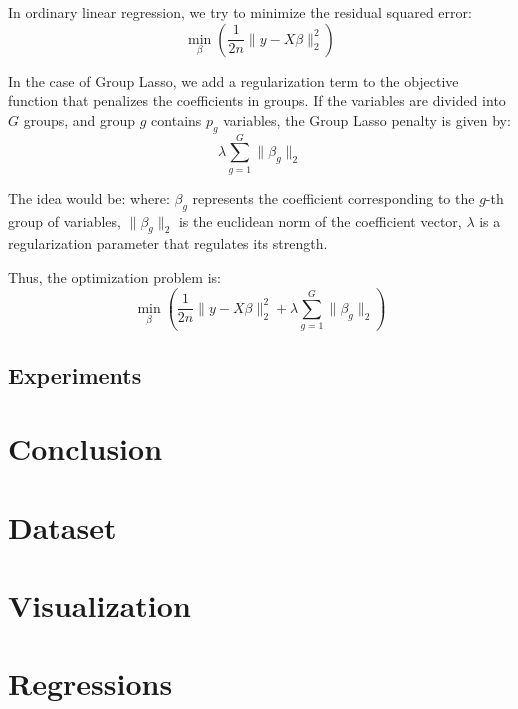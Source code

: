 \documentclass[a4paper, 8pt]{article}
\begin{document}
\begin{multicols}{2}
In ordinary linear regression, we try to minimize the residual squared error:
\begin{equation}
\min_{\beta}\left (\frac{1}{2n}\lVert y-X\beta\rVert^{2}_{2} \right)
\end{equation}

In the case of Group Lasso, we add a regularization term to the objective function that penalizes the coefficients in groups. If the variables are divided into $G$ groups, and group $g$ contains $p_{g}$ variables, the Group Lasso penalty is given by:
\begin{equation}
\lambda \sum_{g=1}^{G}\lVert \beta_{g} \rVert_{2}
\end{equation}

The idea would be: where: $\beta_g$ represents the coefficient corresponding to the $g$-th group of variables, $\lVert \beta_g \rVert_2$ is the euclidean norm of the coefficient vector, $\lambda$ is a regularization parameter that regulates its strength.

Thus, the optimization problem is:
\begin{equation}
\min_{\beta}\left (\frac{1}{2n}\lVert y-X\beta\rVert^{2}_{2} + \lambda \sum_{g=1}^{G}\lVert \beta_{g} \rVert_{2}\right)
\end{equation}

\subsection{Experiments}


\section{Conclusion}
\noindent

\end{multicols}


\pagebreak
\appendix

\section{Dataset}



\section{Visualization}

\section{Regressions}



% 
% 
\end{document}
